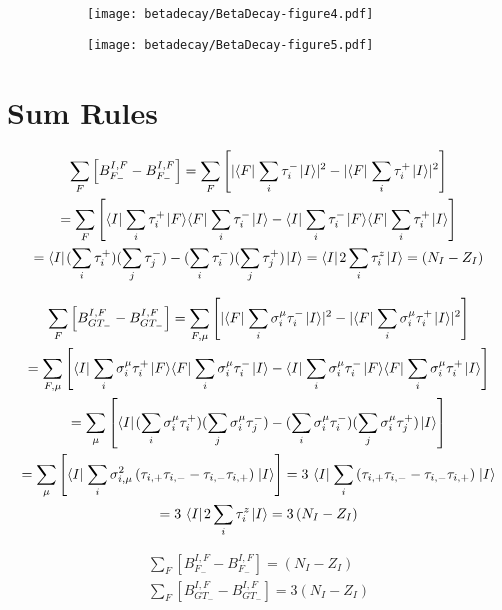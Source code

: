 \documentclass[thesis.tex]{subfiles}
\begin{document}
\begin{figure}
  \centering
  \begin{subfigure}{0.5\linewidth}
    \centering
    \hspace{1.0cm}
    \texttt{[image: betadecay/BetaDecay-figure4.pdf]}
  \end{subfigure}
  \hspace{-0.175\linewidth}
  \begin{subfigure}{0.5\linewidth}
    \centering
    \hspace{1.0cm}
    \texttt{[image: betadecay/BetaDecay-figure5.pdf]}
  \end{subfigure}
\end{figure}



\section{Sum Rules}

\begin{gather}
  \sum_{F} \left[ B_{F_{-}}^{I,F} - B_{F_{-}}^{I,F} \right] = \sum_{F} \left[ \lvert \langle F |\hspace{1pt}\sum_{i}\tau_{i}^{-}\hspace{1pt}\lvert I \rangle \rvert^{2} - \lvert \langle F |\hspace{1pt}\sum_{i}\tau_{i}^{+}\hspace{1pt}\lvert I \rangle \rvert^{2} \right] \notag \\
  = \sum_{F} \left[ \langle I |\hspace{1pt}\sum_{i}\tau_{i}^{+}\hspace{1pt}\lvert F \rangle\langle F |\hspace{1pt}\sum_{i}\tau_{i}^{-}\hspace{1pt}\lvert I \rangle - \langle I |\hspace{1pt}\sum_{i}\tau_{i}^{-}\hspace{1pt}\lvert F \rangle\langle F |\hspace{1pt}\sum_{i}\tau_{i}^{+}\hspace{1pt}\lvert I \rangle \right] \notag \\
  = \langle I |\hspace{1pt} (\sum_{i}\tau_{i}^{+}) (\sum_{j}\tau_{j}^{-}) - (\sum_{i}\tau_{i}^{-}) (\sum_{j}\tau_{j}^{+}) \hspace{1pt}\lvert I \rangle = \langle I |\hspace{1pt} 2\sum_{i}\tau_{i}^{z} \hspace{1pt}\lvert I \rangle = \left( N_{I} - Z_{I} \right)
\end{gather}

\begin{gather}
  \sum_{F} \left[ B_{GT_{-}}^{I,F} - B_{GT_{-}}^{I,F} \right] = \sum_{F,\mu} \left[ \lvert \bra{F}\sum_{i}\sigma_{i}^{\mu}\tau_{i}^{-}\ket{I} \rvert^{2} - \lvert \bra{F}\sum_{i}\sigma_{i}^{\mu}\tau_{i}^{+}\ket{I} \rvert^{2} \right] \notag \\
  = \sum_{F,\mu} \left[ \bra{I}\sum_{i}\sigma_{i}^{\mu}\tau_{i}^{+}\ket{F}\bra{F}\sum_{i}\sigma_{i}^{\mu}\tau_{i}^{-}\ket{I} - \bra{I}\sum_{i}\sigma_{i}^{\mu}\tau_{i}^{-}\ket{F}\bra{F}\sum_{i}\sigma_{i}^{\mu}\tau_{i}^{+}\ket{I} \right] \notag \\
  = \sum_{\mu} \left[ \bra{I} (\sum_{i}\sigma_{i}^{\mu}\tau_{i}^{+}) (\sum_{j}\sigma_{i}^{\mu}\tau_{j}^{-}) - (\sum_{i}\sigma_{i}^{\mu}\tau_{i}^{-}) (\sum_{j}\sigma_{i}^{\mu}\tau_{j}^{+}) \ket{I} \right] \notag \\
  = \sum_{\mu} \left[ \bra{I} \sum_{i}\sigma_{i,\mu}^{2}\left( \tau_{i,+}\tau_{i,-} - \tau_{i,-}\tau_{i,+} \right) \ket{I} \right] = 3\ \bra{I} \sum_{i}\left( \tau_{i,+}\tau_{i,-} - \tau_{i,-}\tau_{i,+} \right) \ket{I} \notag \\
  = 3\ \bra{I} 2\sum_{i}\tau_{i}^{z} \ket{I} = 3\left( N_{I} - Z_{I} \right)
\end{gather}

\begin{gather}
  \sum_{F} \left[ B_{F_{-}}^{I,F} - B_{F_{-}}^{I,F} \right] = \left( N_{I} - Z_{I} \right) \\
  \sum_{F} \left[ B_{GT_{-}}^{I,F} - B_{GT_{-}}^{I,F} \right] = 3\left( N_{I} - Z_{I} \right)
\end{gather}
\end{document}
